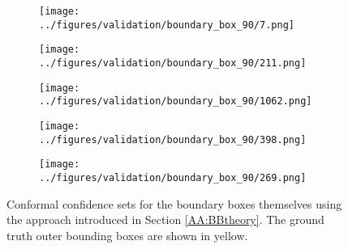 \begin{figure}[h!]
	\hspace{0.05cm}
	\begin{subfigure}{0.18\textwidth}
		\centering
		\texttt{[image: ../figures/validation/boundary\_box\_90/7.png]}
		\label{fig:1}
	\end{subfigure}
	\begin{subfigure}{0.18\textwidth}
		\centering
		\texttt{[image: ../figures/validation/boundary\_box\_90/211.png]}
		\label{fig:1}
	\end{subfigure}
	\begin{subfigure}{0.18\textwidth}
		\centering
		\texttt{[image: ../figures/validation/boundary\_box\_90/1062.png]}
		\label{fig:1}
	\end{subfigure}
	\begin{subfigure}{0.18\textwidth}
		\centering
		\texttt{[image: ../figures/validation/boundary\_box\_90/398.png]}
		\label{fig:1}
	\end{subfigure}
	\begin{subfigure}{0.18\textwidth}
		\centering
		\texttt{[image: ../figures/validation/boundary\_box\_90/269.png]}
		\label{fig:1}
	\end{subfigure}
	\label{fig:grid}
	\caption{Conformal confidence sets for the boundary boxes themselves using the approach introduced in Section \ref{AA:BBtheory}. The ground truth outer bounding boxes are shown in yellow.}\label{fig:resbb}
\end{figure}

